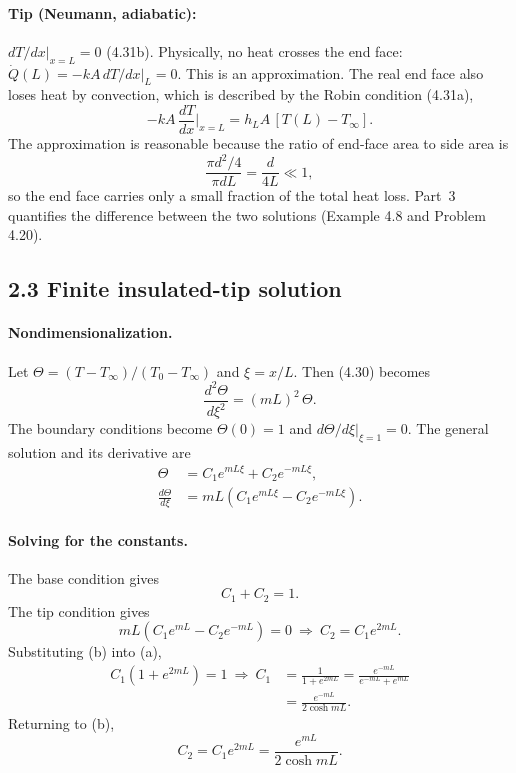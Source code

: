 \documentclass[reprint, amsmath, amssymb, aps, prl]{revtex4-2}
\newcommand{\Qdot}{\dot Q}
\begin{document}
\paragraph*{Tip (Neumann, adiabatic):} $dT/dx|_{x=L}=0$ (4.31b). Physically, no heat
crosses the end face: $\Qdot(L)=-kA\,dT/dx|_L=0$. This is an approximation. The real end
face also loses heat by convection, which is described by the Robin condition (4.31a),
\begin{equation*}
-kA\,\frac{dT}{dx}\Big|_{x=L}=h_LA\,[T(L)-T_\infty].
\end{equation*}
The approximation is reasonable because the ratio of end-face area to side area is
\begin{equation*}
\frac{\pi d^2/4}{\pi dL}=\frac{d}{4L}\ll1,
\end{equation*}
so the end face carries only a small fraction of the total heat loss. Part~3 quantifies
the difference between the two solutions (Example 4.8 and Problem 4.20).

\subsection*{2.3 Finite insulated-tip solution}

\paragraph*{Nondimensionalization.}
Let $\Theta=(T-T_\infty)/(T_0-T_\infty)$ and $\xi=x/L$. Then (4.30) becomes
\begin{equation}
\frac{d^2\Theta}{d\xi^2}=(mL)^2\,\Theta.
\tag{4.34}
\end{equation}
The boundary conditions become $\Theta(0)=1$ and $d\Theta/d\xi|_{\xi=1}=0$. The general
solution and its derivative are
\begin{align*}
\Theta&=C_1e^{mL\xi}+C_2e^{-mL\xi},\\
\frac{d\Theta}{d\xi}&=mL\left(C_1e^{mL\xi}-C_2e^{-mL\xi}\right).
\end{align*}

\paragraph*{Solving for the constants.}
The base condition gives
\begin{equation}
C_1+C_2=1.
\tag{a}
\end{equation}
The tip condition gives
\begin{equation}
mL\left(C_1e^{mL}-C_2e^{-mL}\right)=0\ \Rightarrow\ C_2=C_1e^{2mL}.
\tag{b}
\end{equation}
Substituting (b) into (a),
\begin{align*}
C_1\left(1+e^{2mL}\right)=1\ \Rightarrow\
C_1&=\frac{1}{1+e^{2mL}}=\frac{e^{-mL}}{e^{-mL}+e^{mL}}\\
&=\frac{e^{-mL}}{2\cosh mL}.
\end{align*}
Returning to (b),
\begin{equation*}
C_2=C_1e^{2mL}=\frac{e^{mL}}{2\cosh mL}.
\end{equation*}
\end{document}
